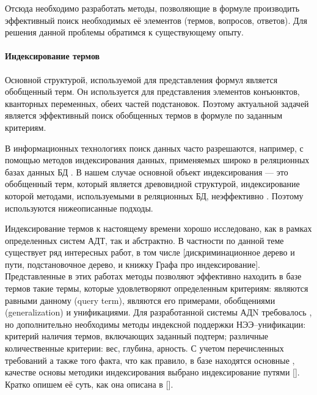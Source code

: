 Отсюда необходимо разработать методы, позволяющие в формуле производить эффективный поиск необходимых её элементов (термов, вопросов, ответов). Для решения данной проблемы обратимся к существующему опыту.

\paragraph{Индексирование термов}
Основной структурой, используемой для представления формул является обобщенный терм. Он используется для представления элементов конъюнктов, кванторных переменных, обеих частей подстановок. Поэтому актуальной задачей является эффективный поиск обобщенных термов в формуле по заданным критериям.

В информационных технологиях поиск данных часто разрешаются, например, с помощью методов индексирования данных, применяемых широко в реляционных базах данных БД \cite{Ulman}. В нашем случае основной объект индексирования --- это обобщенный терм, который является древовидной структурой, индексирование которой методами, используемыми в  реляционных БД, неэффективно \cite{Graf}. Поэтому используются нижеописанные подходы.

Индексирование термов к настоящему времени хорошо исследовано, как в рамках определенных систем АДТ, так и абстрактно. В частности по данной теме существует ряд интересных работ, в том числе [дискриминационное дерево и пути, подстановочное дерево, и книжку Графа про индексирование]. Представленные в этих работах методы позволяют эффективно находить в базе термов такие термы, которые удовлетворяют определенным критериям: являются равными данному (query term), являются его примерами, обобщениями (generalization) и унификациями. Для разработанной системы АДN требовалось , но дополнительно необходимы методы индексной поддержки НЭЭ--унификации: критерий наличия термов, включающих заданный подтерм; различные количественные критерии: вес, глубина, арность. С учетом перечисленных требований а также того факта, что как правило, в базе находятся основные , качестве основы методики индексирования выбрано индексирование путями []. Кратко опишем её суть, как она описана в [].

